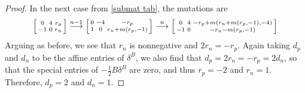 \documentclass{amsart}
\theoremstyle{definition}
\theoremstyle{remark}
\numberwithin{equation}{section}
\newcommand{\0}{{\mathbf{0}}}
\begin{document}
\begin{proof}
In the next case from \cref{submat tab}, the mutations are
\[\begin{bsmallmatrix*}
0 & 4 & r_p\\
-1 & 0 &r_n
\end{bsmallmatrix*}\overset{n-1}{\longrightarrow}
\begin{bsmallmatrix*}
0 & -4 & -r_p\\
1 & 0 &r_n+m(r_p,-1)
\end{bsmallmatrix*}\overset{n}{\longrightarrow}
\begin{bsmallmatrix*}
0 & 4 &-r_p+m(r_n+m(r_p,-1),-4)\\
-1 & 0 &-r_n-m(r_p,-1)
\end{bsmallmatrix*}
\]
Arguing as before, we see that $r_n$ is nonnegative and $2r_n=-r_p$.
Again taking $d_p$ and $d_n$ to be the affine entries of $\delta^B$, we also find that $d_p=2r_n=-r_p=2d_n$, so that the special entries of $-\frac12B\delta^B$ are zero, and thus $r_p=-2$ and $r_n=1$.
Therefore,
$d_p=2$ and $d_n=1$.


\end{proof}
\end{document}
